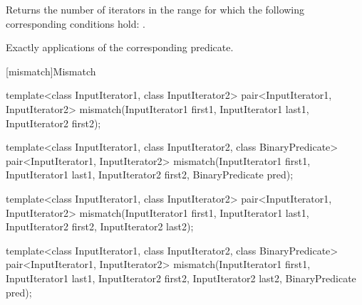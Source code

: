 \begin{itemdescr}
\pnum
\effects
Returns the number of iterators
in the range 
for which the following corresponding
conditions hold:
.

\pnum
\complexity
Exactly
applications of the corresponding predicate.
\end{itemdescr}

[mismatch]{Mismatch}

%
\begin{removedblock}
\begin{itemdecl}
template<class InputIterator1, class InputIterator2>
  pair<InputIterator1, InputIterator2>
      mismatch(InputIterator1 first1, InputIterator1 last1,
               InputIterator2 first2);

template<class InputIterator1, class InputIterator2,
          class BinaryPredicate>
  pair<InputIterator1, InputIterator2>
      mismatch(InputIterator1 first1, InputIterator1 last1,
               InputIterator2 first2, BinaryPredicate pred);

template<class InputIterator1, class InputIterator2>
  pair<InputIterator1, InputIterator2>
    mismatch(InputIterator1 first1, InputIterator1 last1,
             InputIterator2 first2, InputIterator2 last2);

template<class InputIterator1, class InputIterator2,
           class BinaryPredicate>
  pair<InputIterator1, InputIterator2>
    mismatch(InputIterator1 first1, InputIterator1 last1,
             InputIterator2 first2, InputIterator2 last2,
             BinaryPredicate pred);
\end{itemdecl}
\end{removedblock}
